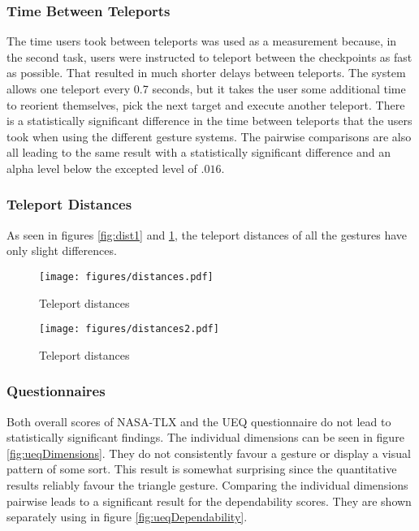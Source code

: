 \subsubsection{Time Between Teleports}
The time users took between teleports was used as a measurement because, in the second task, users were instructed to teleport between the checkpoints as fast as possible. That resulted in much shorter delays between teleports. The system allows one teleport every 0.7 seconds, but it takes the user some additional time to reorient themselves, pick the next target and execute another teleport. There is a statistically significant difference in the time between teleports that the users took when using the different gesture systems. The pairwise comparisons are also all leading to the same result with a statistically significant difference and an alpha level below the excepted level of $.016$. 

\subsubsection{Teleport Distances}
As seen in figures \ref{fig:dist1} and \ref{fig:dist2}, the teleport distances of all the gestures have only slight differences. 

\begin{figure}[!htb]
        \texttt{[image: figures/distances.pdf]}
        \caption{Teleport distances}
        \label{fig:dist1}
    \endminipage\hfill
        \texttt{[image: figures/distances2.pdf]}
        \caption{Teleport distances}
        \label{fig:dist2}
    \endminipage\hfill
\end{figure}



\subsubsection{Questionnaires}
Both overall scores of NASA-TLX and the UEQ questionnaire do not lead to statistically significant findings. The individual dimensions can be seen in figure \ref{fig:ueqDimensions}. They do not consistently favour a gesture or display a visual pattern of some sort. This result is somewhat surprising since the quantitative results reliably favour the triangle gesture. Comparing the individual dimensions pairwise leads to a significant result for the dependability scores. They are shown separately using in figure \ref{fig:ueqDependability}. 

